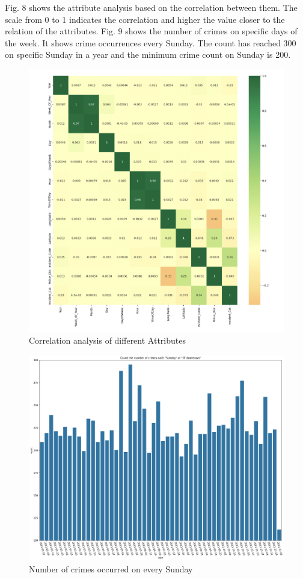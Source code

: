\documentclass[conference,final, 10pt]{IEEEtran}
\begin{document}
Fig. 8 shows the attribute analysis based on the correlation between
them. The scale from 0 to 1 indicates the correlation and higher the
value closer to the relation of the attributes. Fig. 9 shows the number
of crimes on specific days of the week. It shows crime occurrences every
Sunday. The count has reached 300 on specific Sunday in a year and the
minimum crime count on Sunday is 200.

\begin{figure}

{\centering \includegraphics[width=0.9\linewidth]{img/fig8} 

}

\caption{Correlation analysis of different Attributes}\label{fig:unnamed-chunk-8}
\end{figure}

\begin{figure}

{\centering \includegraphics[width=0.85\linewidth]{img/fig9} 

}

\caption{Number of crimes occurred on every Sunday}\label{fig:unnamed-chunk-9}
\end{figure}
\end{document}
